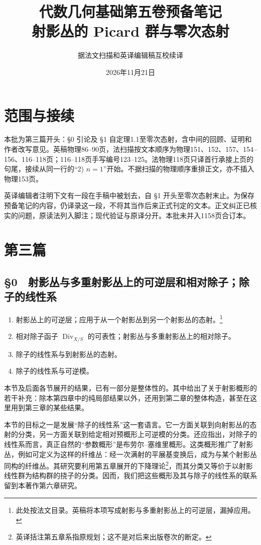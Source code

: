 \documentclass[openany,fontset=fandol]{ctexbook}
\begin{document}
\title{代数几何基础第五卷预备笔记\\射影丛的 Picard 群与零次态射}
\author{据法文扫描和英译编辑稿互校续译}
\date{2026年11月21日}
\maketitle
\chapter*{范围与接续}
本批为第三篇开头：§0 引论及 §1 自定理1.1至零次态射，含中间的回顾、证明和作者改写意见。英稿物理86--90页，法扫描按文本顺序为物理151、152、157、154--156、116--118页；116--118页手写编号123--125。法物理118页只译首行承接上页的句尾，接续从同一行的“2) \(n=1\)”开始。不据扫描的物理顺序重排正文，亦不插入物理153页。

英译编辑者注明下文有一段在手稿中被划去，自 §1 开头至零次态射末止。为保存预备笔记的内容，仍译录这一段，不将其当作后来正式刊定的文本。正文纠正已核实的问题，原读法列入脚注；现代验证与原译分开。本批未并入1158页合订本。
\chapter*{第三篇}
\section*{§0　射影丛与多重射影丛上的可逆层和相对除子；除子的线性系}
\begin{enumerate}
\item 射影丛上的可逆层；应用于从一个射影丛到另一个射影丛的态射。\footnote{此处按法文目录。英稿将本项写成射影与多重射影丛上的可逆层，漏掉应用。}
\item 相对除子函子 \(\operatorname{Div}_{X/S}\) 的可表性；射影丛与多重射影丛上的相对除子。
\item 除子的线性系与到射影丛的态射。
\item 除子的线性系与可逆模。
\end{enumerate}

本节及后面各节展开的结果，已有一部分是整体性的。其中给出了关于射影概形的若干补充：除本第四章中的纯局部结果以外，还用到第二章的整体构造，甚至在这里用到第三章的某些结果。

本节的目标之一是发展“除子的线性系”这一套语言。它一方面关联到向射影丛的态射的分类，另一方面关联到给定相对预概形上可逆模的分类。还应指出，对除子的线性系而言，真正自然的“参数概形”是布劳尔--塞维里概形。这类概形推广了射影丛，例如可定义为这样的纤维丛：经一次满射的平展基变换后，成为与某个射影丛同构的纤维丛。其研究要利用第五章展开的下降理论\footnote{英译括注第五章系指原规划；这不是对后来出版卷次的断定。}，而其分类又等价于以射影线性群为结构群的挠子的分类。因而，我们把这些概形及其与除子的线性系的联系留到本著作第六章研究。
\end{document}
